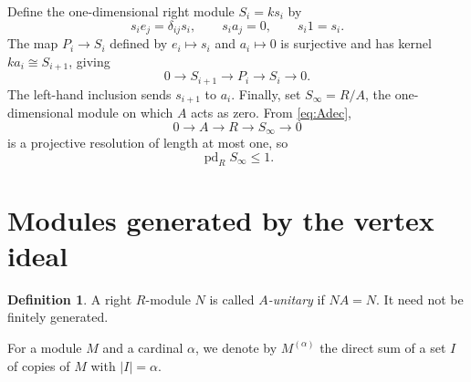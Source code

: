 \documentclass[11pt]{amsart}
\theoremstyle{definition}
\newtheorem{definition}[theorem]{Definition}
\theoremstyle{remark}
\newcommand{\pd}{\operatorname{pd}}
\begin{document}
Define the one-dimensional right module $S_i=ks_i$ by
\[
s_ie_j=\delta_{ij}s_i,\qquad s_ia_j=0,\qquad s_i1=s_i.
\]
The map $P_i\to S_i$ defined by $e_i\mapsto s_i$ and $a_i\mapsto0$ is surjective and has kernel $ka_i\cong S_{i+1}$, giving
\begin{equation}\label{eq:ses}
0\longrightarrow S_{i+1}
\longrightarrow P_i
\longrightarrow S_i\longrightarrow0.
\end{equation}
The left-hand inclusion sends $s_{i+1}$ to $a_i$. Finally, set $S_\infty=R/A$, the one-dimensional module on which $A$ acts as zero. From \eqref{eq:Adec},
\begin{equation}\label{eq:Sinf}
0\longrightarrow A\longrightarrow R\longrightarrow S_\infty\longrightarrow0
\end{equation}
is a projective resolution of length at most one, so
\begin{equation}\label{eq:pdSinf}
\pd_R S_\infty\leq1.
\end{equation}



\section{Modules generated by the vertex ideal}\label{sec:unitary}
\begin{definition}
A right $R$-module $N$ is called \emph{$A$-unitary} if $NA=N$. It need not be finitely generated.
\end{definition}

For a module $M$ and a cardinal $\alpha$, we denote by $M^{(\alpha)}$ the direct sum of a set $I$ of copies of $M$ with $|I|=\alpha$.
\end{document}
